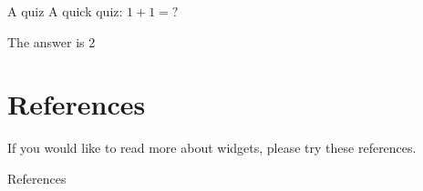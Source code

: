 
\begin{frame}{A quiz}
A quick quiz: $1 + 1 = ?$
\begin{quiz}
The answer is 2
\end{quiz}
\end{frame}

\section{References}
If you would like to read more about widgets, please try these references.

\begin{frame}[allowframebreaks]{References}


\end{frame}


